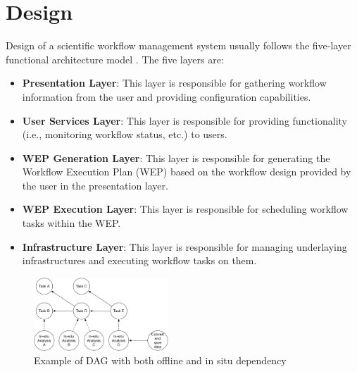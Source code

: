 \section{Design}
Design of a scientific workflow management system usually follows the five-layer functional architecture model \cite{liu2015survey, altintas2004kepler, deelman2005pegasus, ogasawara2013chiron, zhao2007swift}. The five layers are:

\begin{itemize}
\item \textbf{Presentation Layer}:  This layer is responsible for gathering workflow information from the user and providing configuration capabilities.
\item \textbf{User Services Layer}: This layer is responsible for providing functionality (i.e., monitoring workflow status, etc.) to users.
\item \textbf{WEP Generation Layer}: This layer is responsible for generating the Workflow Execution Plan (WEP) based on the workflow design provided by the user in the presentation layer.
\item \textbf{WEP Execution Layer}: This layer is responsible for scheduling workflow tasks within the WEP.
\item \textbf{Infrastructure Layer}: This layer is responsible for managing underlaying infrastructures and executing workflow tasks on them.
\end{itemize}
\begin{figure}[h]
    \centering
    \includegraphics[width=0.45\textwidth]{figures/dag.pdf}
    \caption{Example of DAG with both offline and in situ dependency}
    \label{dag}
    
\end{figure}

